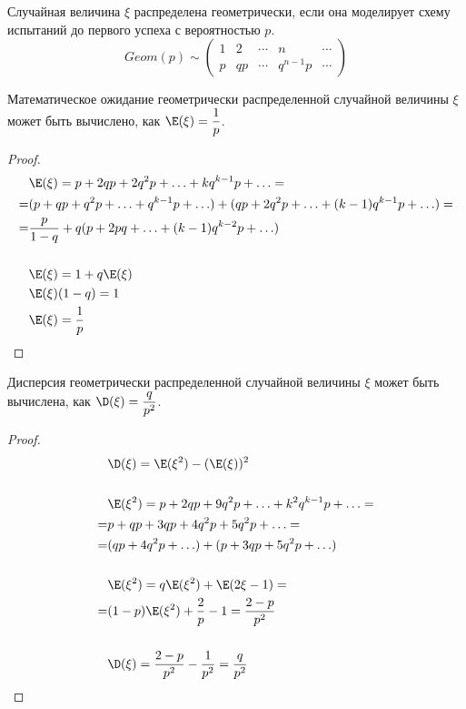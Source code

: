 \documentclass[12pt]{article}
\begin{document}
\begin{definition}
    Случайная величина $\xi$ распределена геометрически, если она моделирует схему испытаний до первого успеха с вероятностью $p$.
    $$Geom(p) \sim \begin{pmatrix}
        1 & 2 & \cdots & n & \cdots\\
        p & qp & \cdots & q^{n-1}p & \cdots
    \end{pmatrix}$$
\end{definition}

\begin{lemma}
    Математическое ожидание геометрически распределенной случайной величины $\xi$ может быть вычислено, как $\E(\xi)=\dfrac{1}{p}$.
\end{lemma}

\begin{proof}
    \begin{align*}
        &\E(\xi)=p+2qp+2q^2p+\ldots+kq^{k-1}p+\ldots=\\
        =&(p+qp+q^2p+\ldots+q^{k-1}p+\ldots)+(qp+2q^2p+\ldots+(k-1)q^{k-1}p+\ldots)=\\
        =&\frac{p}{1-q}+q(p+2pq+\ldots+(k-1)q^{k-2}p+\ldots)\\\\
        &\E(\xi)=1+q\E(\xi)\\
        &\E(\xi)(1-q)=1\\
        &\E(\xi)=\frac{1}{p}
    \end{align*}
\end{proof}

\begin{lemma}
    Дисперсия геометрически распределенной случайной величины $\xi$ может быть вычислена, как $\D(\xi)=\dfrac{q}{p^2}$.
\end{lemma}

\begin{proof}
    \begin{align*}
        &\D(\xi)=\E(\xi^2)-(\E(\xi))^2\\\\
        &\E(\xi^2)=p+2qp+9q^2p+\ldots+k^2q^{k-1}p+\ldots=\\
        =&p+qp+3qp+4q^2p+5q^2p+\ldots=\\
        =&(qp+4q^2p+\ldots)+(p+3qp+5q^2p+\ldots)\\\\
        &\E(\xi^2)=q\E(\xi^2)+\E(2\xi-1)=\\
        =&(1-p)\E(\xi^2)+\frac{2}{p}-1=\frac{2-p}{p^2}\\\\
        &\D(\xi)=\frac{2-p}{p^2}-\frac{1}{p^2}=\frac{q}{p^2}
    \end{align*}
\end{proof}
\end{document}
